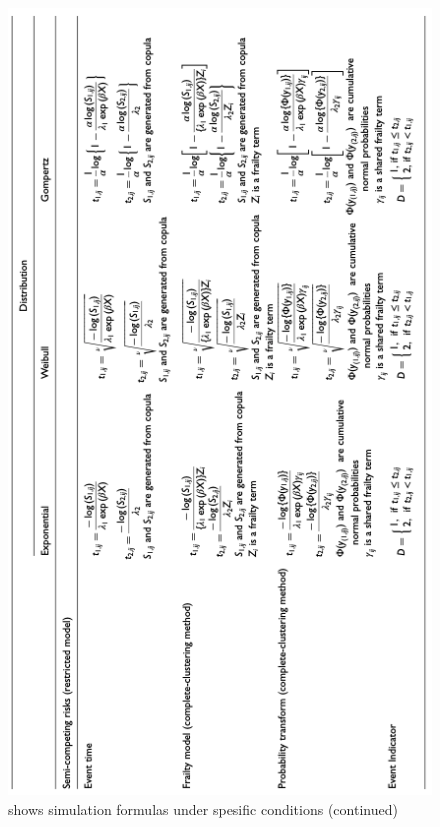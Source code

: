 \begin{figure}[h]
	\centering
	\includegraphics[scale=0.56, angle=270]{Figures/COMPETING2.png}
	\caption{\parencite{meng_simulating_2023} shows simulation formulas under spesific conditions (continued)}
\end{figure}
